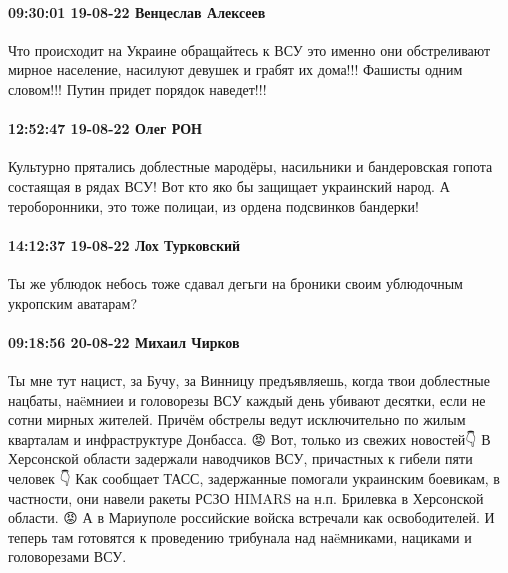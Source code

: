  
 
 
 
 

\paragraph{09:30:01 19-08-22 Венцеслав Алексеев}

Что происходит на Украине обращайтесь к ВСУ это именно они обстреливают мирное
население, насилуют девушек и грабят их дома!!! Фашисты одним словом!!! Путин
придет порядок наведет!!!

\paragraph{12:52:47 19-08-22 Олег РОН}

Культурно прятались доблестные мародёры, насильники и бандеровская гопота
состаящая в рядах ВСУ! Вот кто яко бы защищает украинский народ. А
тероборонники, это тоже полицаи, из ордена подсвинков бандерки!

\paragraph{14:12:37 19-08-22 Лох Турковский}

Ты же ублюдок небось тоже сдавал дегьги на броники своим ублюдочным укропским
аватарам?

\paragraph{09:18:56 20-08-22 Михаил Чирков}

Ты мне тут нацист, за Бучу, за Винницу предъявляешь, когда твои доблестные нацбаты, наëмниеи и головорезы ВСУ каждый день убивают десятки, если не сотни мирных жителей. Причём обстрелы ведут исключительно по жилым кварталам и инфраструктуре Донбасса.
😡
Вот, только из свежих новостей👇
В Херсонской области задержали наводчиков ВСУ, причастных к гибели пяти человек
👇
Как сообщает ТАСС, задержанные помогали украинским боевикам, в частности, они навели ракеты РСЗО HIMARS на н.п. Брилевка в Херсонской области.
😡
А в Мариуполе российские войска встречали как освободителей.
И теперь там готовятся к проведению трибунала над наëмниками, нациками и головорезами ВСУ.

